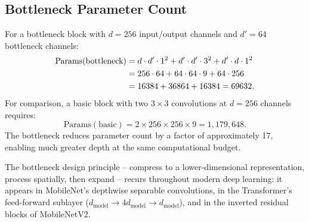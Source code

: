 \documentclass[12pt,a4paper]{article}
\begin{document}
\subsection{Bottleneck Parameter Count}

For a bottleneck block with $d=256$ input/output channels and $d'=64$ bottleneck channels:
\begin{align}
  \text{Params}(\text{bottleneck}) &= d \cdot d' \cdot 1^2 + d' \cdot d' \cdot 3^2 + d' \cdot d \cdot 1^2 \notag \\
  &= 256 \cdot 64 + 64 \cdot 64 \cdot 9 + 64 \cdot 256 \notag \\
  &= 16384 + 36864 + 16384 = 69632.
  \label{eq:bottleneck_params}
\end{align}
For comparison, a basic block with two $3\times3$ convolutions at $d=256$ channels requires:
\begin{equation}
  \text{Params}(\text{basic}) = 2 \times 256 \times 256 \times 9 = 1{,}179{,}648.
  \label{eq:basic_params}
\end{equation}
The bottleneck reduces parameter count by a factor of approximately 17, enabling much greater depth at the same computational budget.

\begin{keyinsight}
The bottleneck design principle -- compress to a lower-dimensional representation, process spatially, then expand -- recurs throughout modern deep learning: it appears in MobileNet's depthwise separable convolutions, in the Transformer's feed-forward sublayer ($d_{\text{model}} \to 4 d_{\text{model}} \to d_{\text{model}}$), and in the inverted residual blocks of MobileNetV2.
\end{keyinsight}
\end{document}

